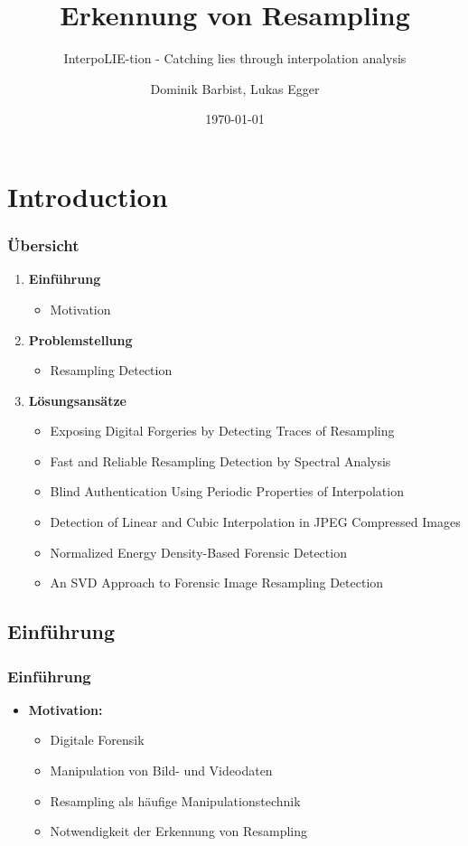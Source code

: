 \documentclass[11pt,t,usepdftitle=false,aspectratio=169]{beamer}
\title[Erkennung von Resampling]{Erkennung von Resampling}
\subtitle{InterpoLIE-tion - Catching lies through interpolation analysis}
\author[Dominik Barbist, Lukas Egger]{Dominik Barbist, Lukas Egger \\ \vspace{0.5em}}
\date{\today}
\begin{document}
\section{Introduction}

\begin{frame}
	\frametitle{Übersicht}
	\begin{enumerate}
		\item \textbf{Einführung}
		\begin{itemize}
			\item Motivation
		\end{itemize}
		\item \textbf{Problemstellung}
		\begin{itemize}
			\item Resampling Detection
		\end{itemize}
		\item \textbf{Lösungsansätze}
		\begin{itemize}
			\item Exposing Digital Forgeries by Detecting Traces of Resampling
			\item Fast and Reliable Resampling Detection by Spectral Analysis
			\item Blind Authentication Using Periodic Properties of Interpolation
			\item Detection of Linear and Cubic Interpolation in JPEG Compressed Images
			\item Normalized Energy Density-Based Forensic Detection
			\item An SVD Approach to Forensic Image Resampling Detection
		\end{itemize}
	\end{enumerate}
\end{frame}

\subsection{Einführung}

\begin{frame}
	\frametitle{Einführung}
	\begin{itemize}
		\item \textbf{Motivation:} 
		\begin{itemize}
			\item Digitale Forensik
			\item Manipulation von Bild- und Videodaten
			\item Resampling als häufige Manipulationstechnik
			\item Notwendigkeit der Erkennung von Resampling
		\end{itemize}
	\end{itemize}
\end{frame}
\end{document}
